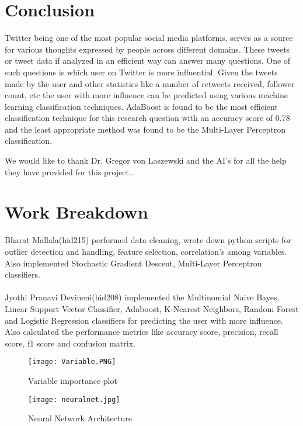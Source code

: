 \documentclass[sigconf]{acmart}
\begin{document}
\section{Conclusion}
Twitter being one of the most popular social media platforms, serves as a source for various thoughts expressed by people across different domains. These tweets or tweet data if analyzed in an efficient way can answer many questions. One of such questions is which user on Twitter is more influential. Given the tweets made by the user and other statistics like a number of retweets received, follower count, etc the user with more influence can be predicted using various machine learning classification techniques. AdaBoost is found to be the most efficient classification technique for this research question with an accuracy score of 0.78 and the least appropriate method was found to be the Multi-Layer Perceptron classification.  


\begin{acks}
We would like to thank Dr. Gregor von Laszewski and the AI's for all the help they have provided for this project..
\end{acks}


 
\clearpage
\appendix
\section{Work Breakdown}
Bharat Mallala(hid215) performed data cleaning, wrote down python scripts for outlier detection and handling, feature selection, correlation's among variables. Also implemented Stochastic Gradient Descent, Multi-Layer Perceptron classifiers.\\\\

Jyothi Pranavi Devineni(hid208) implemented the Multinomial Naive Bayes, Linear Support Vector Classifier, Adaboost, K-Nearest Neighbors, Random Forest and Logistic Regression classifiers for predicting the user with more influence. Also calculated the performance metrics like accuracy score, precision, recall score, f1 score and confusion matrix.
\clearpage
\begin{figure}[htp]
    \texttt{[image: Variable.PNG]}
    \caption{Variable importance plot}
    \label{fig:figure1}
\end{figure}

\begin{figure}[htp]
    \texttt{[image: neuralnet.jpg]}
    \caption{Neural Network Architecture \cite{google1}}
    \label{fig:figure2}
\end{figure}
\end{document}
